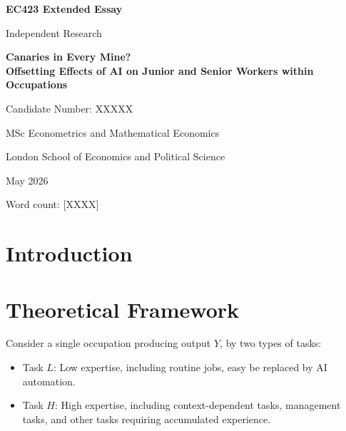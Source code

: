 \documentclass[a4paper, 12pt]{article}
\newcommand{\candidatenumber}{XXXXX}   %
\newcommand{\coursecode}{EC423}
\begin{document}
\begin{titlepage}
  \centering
  \vspace*{3cm}
  {\Large \textbf{\coursecode{} Extended Essay} \par}
  \vspace{1cm}
  {\large Independent Research \par}
  \vspace{2cm}
  {\LARGE \textbf{Canaries in Every Mine? \\ Offsetting Effects of AI on 
  Junior and Senior Workers within Occupations} \par}
  \vspace{2cm}
  {\large Candidate Number: \candidatenumber \par}
  \vspace{1cm}
  {\large MSc Econometrics and Mathematical Economics \par}
  {\large London School of Economics and Political Science \par}
  \vspace{1cm}
  {\large May 2026 \par}
  \vfill
  {\small Word count: [XXXX] \par}
\end{titlepage}

\newpage
\begin{abstract}
\end{abstract}

\newpage
\tableofcontents
\newpage


\section{Introduction}
\label{sec:intro}



\section{Theoretical Framework}
\label{sec:theory}

Consider a single occupation producing output $Y$, by two types of tasks:

\begin{itemize}
  \item Task $L$: Low expertise, including routine jobs, easy be replaced by AI automation.
  \item Task $H$: High expertise, including context-dependent tasks, management tasks, and other tasks requiring accumulated experience.

\end{itemize}
\end{document}
